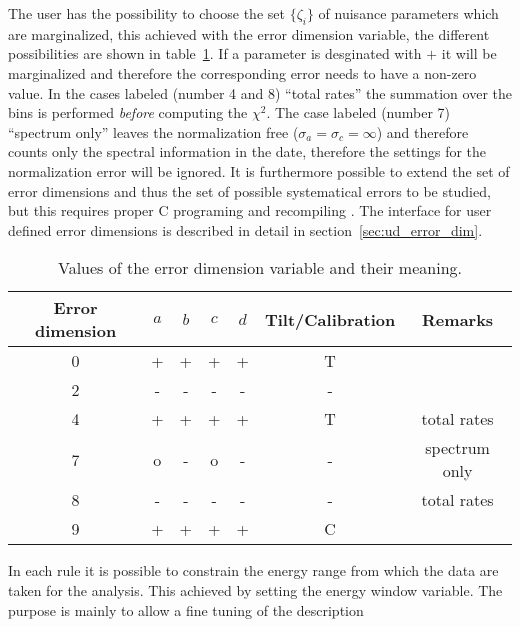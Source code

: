 The user has the possibility to choose the set $\{\zeta_i\}$ of nuisance 
parameters which are marginalized, this achieved with the error dimension 
variable, the different possibilities are shown in
table~\ref{tab:error_dim}. If a parameter is desginated with $+$ it will
be marginalized and therefore the corresponding error needs to have a non-zero
value. In the cases labeled (number 4 and 8) ``total rates'' 
the summation over the bins is performed \emph{before} computing 
the $\chi^2$. The case labeled (number 7) ``spectrum only'' leaves the 
normalization free ($\sigma_a=\sigma_c=\infty$) and therefore counts only the 
spectral information in the date, therefore
the settings for the normalization error will be ignored. It is furthermore
possible to extend the set of error dimensions and thus the set of possible 
systematical errors to be studied, but this requires proper C programing
and recompiling \GLOBES. The interface for user defined error dimensions is
described in detail in section~\ref{sec:ud_error_dim}.

\begin{center}
\begin{table}[hbt!]
\begin{center}
\begin{tabular}[h]{|c|cccc|c|c|}
\hline
Error dimension&$a$&$b$&$c$&$d$&Tilt/Calibration&Remarks\\
\hline
\hline
0&+&+&+&+&T&\\
2&-&-&-&-&-&\\
4&+&+&+&+&T&total rates\\
7&o&-&o&-&-&spectrum only\\
8&-&-&-&-&-&total rates\\
9&+&+&+&+&C&\\
\hline
\end{tabular}
\caption[Table of error dimensions]{\label{tab:error_dim}
Values of the error dimension variable and their meaning.
 }
\end{center} 
\end{table} 
\end{center}

In each rule it is possible to constrain the energy range from which the
data are taken for the analysis. This achieved by 
setting the energy window
variable. The purpose is mainly to allow a fine tuning of the description

